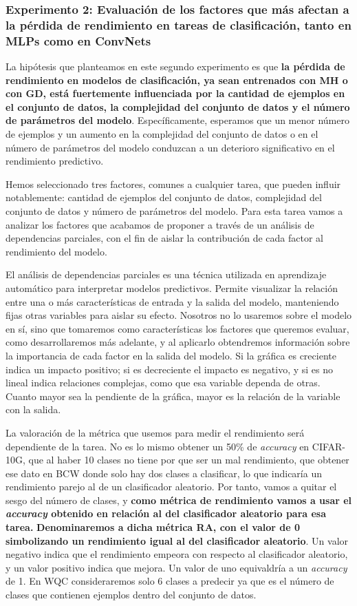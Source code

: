 \subsubsection{Experimento 2: Evaluación de los factores que más afectan a la pérdida de rendimiento en tareas de clasificación, tanto en MLPs como en ConvNets}

La hipótesis que planteamos en este segundo experimento es que\textbf{ la pérdida de rendimiento en modelos de clasificación, ya sean entrenados con MH o con GD, está fuertemente influenciada por la cantidad de ejemplos en el conjunto de datos, la complejidad del conjunto de datos y el número de parámetros del modelo}. Específicamente, esperamos que un menor número de ejemplos y un aumento en la complejidad del conjunto de datos o en el número de parámetros del modelo conduzcan a un deterioro significativo en el rendimiento predictivo.

Hemos seleccionado tres factores, comunes a cualquier tarea, que pueden influir notablemente: cantidad de ejemplos del conjunto de datos, complejidad del conjunto de datos y número de parámetros del modelo. Para esta tarea vamos a analizar los factores que acabamos de proponer a través de un análisis de dependencias parciales, con el fin de aislar la contribución de cada factor al rendimiento del modelo.

El análisis de dependencias parciales es una técnica utilizada en aprendizaje automático para interpretar modelos predictivos. Permite visualizar la relación entre una o más características de entrada y la salida del modelo, manteniendo fijas otras variables para aislar su efecto. Nosotros no lo usaremos sobre el modelo en sí, sino que tomaremos como características los factores que queremos evaluar, como desarrollaremos más adelante, y al aplicarlo obtendremos información sobre la importancia de cada factor en la salida del modelo. Si la gráfica es creciente indica un impacto positivo; si es decreciente el impacto es negativo, y si es no lineal indica relaciones complejas, como que esa variable dependa de otras. Cuanto mayor sea la pendiente de la gráfica, mayor es la relación de la variable con la salida.

La valoración de la métrica que usemos para medir el rendimiento será dependiente de la tarea. No es lo mismo obtener un 50\% de \textit{accuracy} en CIFAR-10G, que al haber 10 clases no tiene por que ser un mal rendimiento, que obtener ese dato en BCW donde solo hay dos clases a clasificar, lo que indicaría un rendimiento parejo al de un clasificador aleatorio. Por tanto, vamos a quitar el sesgo del número de clases, y \textbf{como métrica de rendimiento vamos a usar el \textit{accuracy} obtenido en relación al del clasificador aleatorio para esa tarea.} \textbf{Denominaremos a dicha métrica RA, con el valor de 0 simbolizando un rendimiento igual al del clasificador aleatorio}. Un valor negativo indica que el rendimiento empeora con respecto al clasificador aleatorio, y un valor positivo indica que mejora. Un valor de uno equivaldría a un \textit{accuracy} de 1. En WQC consideraremos solo 6 clases a predecir ya que es el número de clases que contienen ejemplos dentro del conjunto de datos. 

